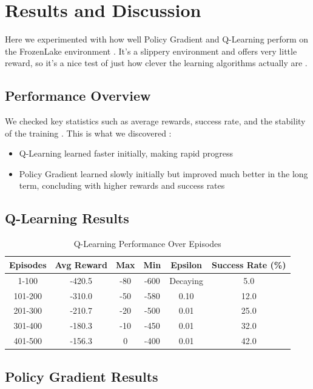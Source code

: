 \documentclass[conference]{IEEEtran}
\begin{document}
\section{Results and Discussion}
Here we experimented with how well Policy Gradient and Q-Learning perform on the FrozenLake environment \cite{Brockman2016}. It's a slippery environment and offers very little reward, so it's a nice test of just how clever the learning algorithms actually are \cite{SuttonBarto2018}.

\subsection{Performance Overview}
We checked key statistics such as average rewards, success rate, and the stability of the training \cite{Henderson2018}. This is what we discovered \cite{Thomas2016}:

\begin{itemize}
\item Q-Learning learned faster initially, making rapid progress \cite{Watkins1992}
\item Policy Gradient learned slowly initially but improved much better in the long term, concluding with higher rewards and success rates \cite{Schulman2015}
\end{itemize}

\subsection{Q-Learning Results}

\begin{table}[h]
\centering
\caption{Q-Learning Performance Over Episodes \cite{Watkins1992}}
\label{tab:ql_results}
\begin{tabular}{@{}cccccc@{}}
\toprule
Episodes & Avg Reward & Max & Min & Epsilon & Success Rate (\%) \\ \midrule
1-100 & -420.5 & -80 & -600 & Decaying & 5.0 \\
101-200 & -310.0 & -50 & -580 & 0.10 & 12.0 \\
201-300 & -210.7 & -20 & -500 & 0.01 & 25.0 \\
301-400 & -180.3 & -10 & -450 & 0.01 & 32.0 \\
401-500 & -156.3 & 0 & -400 & 0.01 & 42.0 \\ \bottomrule
\end{tabular}
\end{table}

\subsection{Policy Gradient Results}
\end{document}
